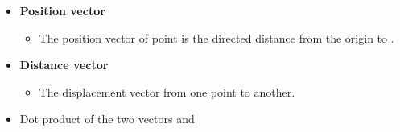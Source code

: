 \begin{ELunit}

\begin{itemize}
\tightlist
\item
  \textbf{Position vector}

  \begin{itemize}
  \tightlist
  \item
    The position vector of point  is the directed distance from the origin to .
  \end{itemize}
\end{itemize}


\begin{itemize}
\tightlist
\item
  \textbf{Distance vector}

  \begin{itemize}
  \tightlist
  \item
    The displacement vector from one point to another.
  \end{itemize}
\end{itemize}




\end{ELunit}

\begin{ELjoin}

\begin{itemize}
\tightlist
\item
  Dot product of the two vectors  and 
\end{itemize}

\begin{ELimportant}{}


\end{ELimportant}

\end{ELjoin}

